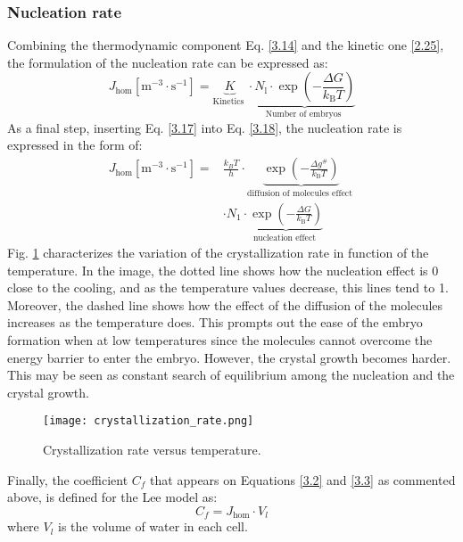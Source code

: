 \subsubsection*{Nucleation rate}
Combining the thermodynamic component Eq. \ref{3.14} and the kinetic one \ref{2.25}, the formulation of the nucleation rate can be expressed as:
\begin{equation}
\label{2.26}
J_{\mathrm{hom}}\left[\mathrm{m}^{-3} \cdot \mathrm{s}^{-1}\right]=\underbrace{K}_{\text {Kinetics }} \cdot \underbrace{N_{\mathrm{l}} \cdot \exp \left(-\frac{\Delta G}{k_{\mathrm{B}} T}\right)}_{\text {Number of embryos }}
\end{equation}
As a final step, inserting Eq. \ref{3.17} into Eq. \ref{3.18}, the nucleation rate is expressed in the form of:
\begin{equation}
\label{2.27}
\begin{aligned}
J_{\mathrm{hom}}\left[\mathrm{m}^{-3} \cdot \mathrm{s}^{-1}\right]
=& \frac{k_{B} T}{h} \cdot \underbrace{\exp \left(-\frac{\Delta g^{\#}}{k_{\mathrm{B}} T}\right)}_{\text {diffusion of molecules effect }} \\ 
& \cdot N_{1} \cdot \underbrace{\exp \left(-\frac{\Delta G}{k_{\mathrm{B}} T}\right)}_{\text {nucleation effect }}
\end{aligned}
\end{equation}
Fig. \ref{fig:boat2} characterizes the variation of the crystallization rate in function of the temperature. In the image, the dotted line shows how the nucleation effect is 0 close to the cooling, and as the temperature values decrease, this lines tend to 1. Moreover, the dashed line shows how the effect of the diffusion of the molecules increases as the temperature does. This prompts out the ease of the embryo formation when at low temperatures since the molecules cannot overcome the energy barrier to enter the embryo. However, the crystal growth becomes harder. This may be seen as constant search of equilibrium among the nucleation and the crystal growth.
\begin{figure}[h]
	\centering
	\texttt{[image: crystallization\_rate.png]}
	\caption{Crystallization rate versus temperature.}	
	\label{fig:boat2}
\end{figure} 
Finally, the coefficient $C_f$ that appears on Equations \ref{3.2} and \ref{3.3} as commented above, is defined for the Lee model as:
\begin{equation}
\label{2.28}
C_f=J_{\mathrm{hom}} \cdot V_{l}
\end{equation}
where $V_{l}$ is the volume of water in each cell.
